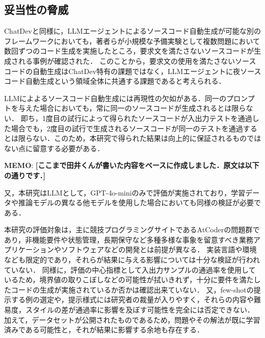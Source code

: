\documentclass[submit,techrep,noauthor]{ipsj}
\newcommand{\memo}[1]{\colorbox{magenta!30}{{\bf MEMO}:}{\color{red!50} {\textbf{[#1]}}}}
\begin{document}
\subsection{妥当性の脅威}
ChatDevと同様に，LLMエージェントによるソースコード自動生成が可能な別のフレームワークにおいて\cite{kiro}も，著者らが小規模な予備実験として複数問題において数回ずつのコード生成を実施したところ，要求文を満たさないソースコードが生成される事例が確認された．
このことから，要求文の使用を満たさないソースコードの自動生成はChatDev特有の課題ではなく，LLMエージェントに夜ソースコード自動生成という領域全体に共通する課題であると考えられる．

LLMによよるソースコード自動生成には再現性の欠如がある．同一のプロンプトを与えた場合においても，常に同一のソースコードが生成されるとは限らない．
即ち，1度目の試行によって得られたソースコードが入出力テストを通過した場合でも，2度目の試行で生成されるソースコードが同一のテストを通過するとは限らない．このため，本研究で得られた結果は向上的に保証されるものではない点に留意する必要がある．

\memo{ここまで田井くんが書いた内容をベースに作成しました．原文は以下の通りです．}

又，本研究はLLMとして，GPT-4o-miniのみで評価が実施されており，学習データや推論モデルの異なる他モデルを使用した場合においても同様の検証が必要である．

本研究の評価対象は，主に競技プログラミングサイトであるAtCoderの問題群であり，非機能要件や状態管理，長期保守など多種多様な事象を留意すべき業務アプリケーションやソフトウェアなどの開発とは前提が異なる．
実装言語や環境なども限定的であり，それらが結果に与える影響については十分な検証が行われていない．
同様に，評価の中心指標として入出力サンプルの通過率を使用しているため，境界値の取りこぼしなどの可能性が拭いきれず，十分に要件を満たしたコードの生成が実施されているか否かは確認出来ていない．
又，few-shotの提示する例の選定や，提示様式には研究者の裁量が入りやすく，それらの内容や難易度，スタイルの差が通過率に影響を及ぼす可能性を完全には否定できない．
加えて，データセットが公開されたものであるため，問題やその解法が既に学習済みである可能性と，それが結果に影響する余地も存在する．
\end{document}
